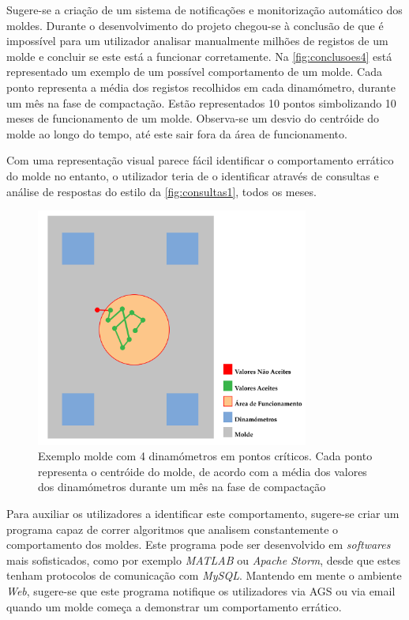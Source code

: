 \documentclass[11pt,twoside,a4paper]{report}
\begin{document}
\newpage
Sugere-se a criação de um sistema de notificações e monitorização automático dos moldes. Durante o desenvolvimento do projeto chegou-se à conclusão de que é impossível para um utilizador analisar manualmente milhões de registos de um molde e concluir se este está a funcionar corretamente. Na \autoref{fig:conclusoes4} está representado um exemplo de um possível comportamento de um molde. Cada ponto representa a média dos registos recolhidos em cada dinamómetro, durante um mês na fase de compactação. Estão representados 10 pontos simbolizando 10 meses de funcionamento de um molde. Observa-se um desvio do centróide do molde ao longo do tempo, até este sair fora da área de funcionamento.\par 
Com uma representação visual parece fácil identificar o comportamento errático do molde no entanto, o utilizador teria de o identificar através de consultas e análise de respostas do estilo da \autoref{fig:consultas1}, todos os meses.
\begin{figure}[H]
	\begin{center}
		\includegraphics[width=0.8\textwidth]{exemplo_molde} %
		\caption[Exemplo molde com 4 dinamómetros em pontos críticos]{Exemplo molde com 4 dinamómetros em pontos críticos. Cada ponto representa o centróide do molde, de acordo com a média dos valores dos dinamómetros durante um mês na fase de compactação}
		\label{fig:conclusoes4}
	\end{center}
\end{figure}
Para auxiliar os utilizadores a identificar este comportamento, sugere-se criar um programa capaz de correr algoritmos que analisem constantemente o comportamento dos moldes. Este programa pode ser desenvolvido em \textit{softwares} mais sofisticados, como por exemplo \textit{MATLAB} ou \textit{Apache Storm}, desde que estes tenham protocolos de comunicação com \textit{MySQL}. Mantendo em mente o ambiente \textit{Web}, sugere-se que este programa notifique os utilizadores via AGS ou via email quando um molde começa a demonstrar um comportamento errático.
\end{document}
